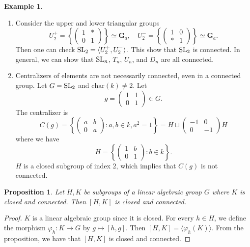 \documentclass[]{pcmi}
\theoremstyle{plain}
\newtheorem{Proposition}[equation]{Proposition}
\theoremstyle{definition}
\newtheorem{Example}[equation]{Example}
\begin{document}
\begin{Example} \phantom{h}
    \begin{enumerate}
        \item Consider the upper and lower triangular groups 
        \[
            U_2^+ = \left \{ \begin{pmatrix} 1 & * \\ 0 & 1 \end{pmatrix} \right \} \simeq \mathbf{G}_a, \quad U_2^- = \left \{ \begin{pmatrix} 1 & 0 \\ * & 1 \end{pmatrix} \right \} \simeq \mathbf{G}_a. 
        \]
        Then one can check $\operatorname{SL}_2 = \langle U_2^+, U_2^- \rangle$. This show that $\operatorname{SL}_2$ is connected. In general, we can show that $\operatorname{SL}_n$, $T_n$, $U_n$, and $D_n$ are all connected. 

        \item Centralizers of elements are not necessarily connected, even in a connected group. Let $G = \operatorname{SL}_2$ and $\text{char}(k) \neq 2$. Let 
        \[
            g = \begin{pmatrix} 1 & 1 \\ 0 & 1 \end{pmatrix} \in G. 
        \]
        The centralizer is 
        \[
            C(g) = \left \{ \begin{pmatrix} a & b \\ 0 & a \end{pmatrix} : a, b \in k, a^2 = 1 \right \} = H \sqcup \begin{pmatrix} -1 & 0 \\ 0 & -1 \end{pmatrix} H
        \]
        where we have 
        \[
            H = \left \{ \begin{pmatrix} 1 & b \\ 0 & 1 \end{pmatrix} : b \in k \right \}. 
        \]
        $H$ is a closed subgroup of index $2$, which implies that $C(g)$ is not connected. 
    \end{enumerate}
\end{Example}

\begin{Proposition}
    Let $H, K$ be subgroups of a linear algebraic group $G$ where $K$ is closed and connected. Then $[H, K]$ is closed and connected. 
\end{Proposition}

\begin{proof}
    $K$ is a linear algebraic group since it is closed. For every $h \in H$, we define the morphism $\varphi_h : K \to G$ by $g \mapsto [h, g]$. Then $[H, K] = \langle \varphi_h(K) \rangle$. From the proposition, we have that $[H, K]$ is closed and connected.   
\end{proof}
\end{document}
